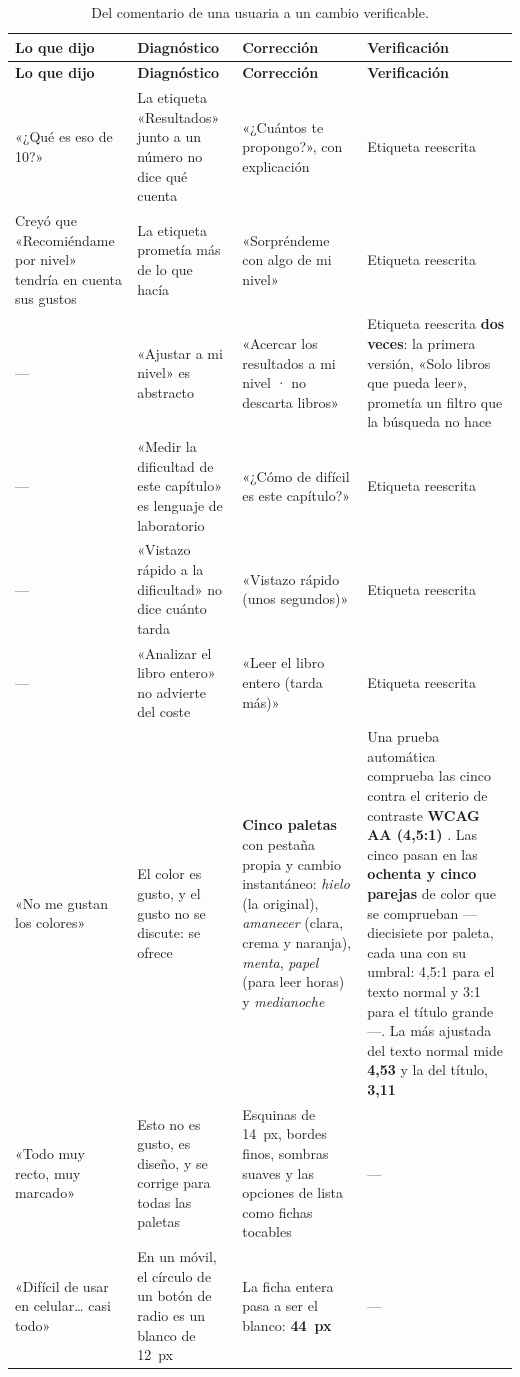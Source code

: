 \documentclass[11pt,a4paper]{article}
\begin{document}
\begin{small}
\begin{longtable}{@{}L{2.9cm} L{3.2cm} L{3.9cm} L{3.9cm}@{}}
\toprule
\textbf{Lo que dijo} & \textbf{Diagnóstico} & \textbf{Corrección} & \textbf{Verificación} \\
\midrule
\endfirsthead
\toprule
\textbf{Lo que dijo} & \textbf{Diagnóstico} & \textbf{Corrección} & \textbf{Verificación} \\
\midrule
\endhead
\bottomrule
\endfoot
\bottomrule
\caption{Del comentario de una usuaria a un cambio verificable.}
\label{cuad:esmeralda}
\endlastfoot
«¿Qué es eso de 10?» & La etiqueta «Resultados» junto a un número no dice qué cuenta & «¿Cuántos te propongo?», con explicación & Etiqueta reescrita \\
\addlinespace
Creyó que «Recomiéndame por nivel» tendría en cuenta sus gustos & La etiqueta prometía más de lo que hacía & «Sorpréndeme con algo de mi nivel» & Etiqueta reescrita \\
\addlinespace
— & «Ajustar a mi nivel» es abstracto & «Acercar los resultados a mi nivel · no descarta libros» & Etiqueta reescrita \textbf{dos veces}: la primera versión, «Solo libros que pueda leer», prometía un filtro que la búsqueda no hace \\
\addlinespace
— & «Medir la dificultad de este capítulo» es lenguaje de laboratorio & «¿Cómo de difícil es este capítulo?» & Etiqueta reescrita \\
\addlinespace
— & «Vistazo rápido a la dificultad» no dice cuánto tarda & «Vistazo rápido (unos segundos)» & Etiqueta reescrita \\
\addlinespace
— & «Analizar el libro entero» no advierte del coste & «Leer el libro entero (tarda más)» & Etiqueta reescrita \\
\addlinespace
«No me gustan los colores» & El color es gusto, y el gusto no se discute: se ofrece & \textbf{Cinco paletas} con pestaña propia y cambio instantáneo: \emph{hielo} (la original), \emph{amanecer} (clara, crema y naranja), \emph{menta}, \emph{papel} (para leer horas) y \emph{medianoche} & Una prueba automática comprueba las cinco contra el criterio de contraste \textbf{WCAG AA (4,5:1)} \parencite{w3c2023wcag}. Las cinco pasan en las \textbf{ochenta y cinco parejas} de color que se comprueban —diecisiete por paleta, cada una con su umbral: 4,5:1 para el texto normal y 3:1 para el título grande—. La más ajustada del texto normal mide \textbf{4,53} y la del título, \textbf{3,11} \\
\addlinespace
«Todo muy recto, muy marcado» & Esto no es gusto, es diseño, y se corrige para todas las paletas & Esquinas de 14~px, bordes finos, sombras suaves y las opciones de lista como fichas tocables & — \\
\addlinespace
«Difícil de usar en celular\dots{} casi todo» & En un móvil, el círculo de un botón de radio es un blanco de 12~px & La ficha entera pasa a ser el blanco: \textbf{44~px} & — \\
\end{longtable}
\end{small}
\end{document}
